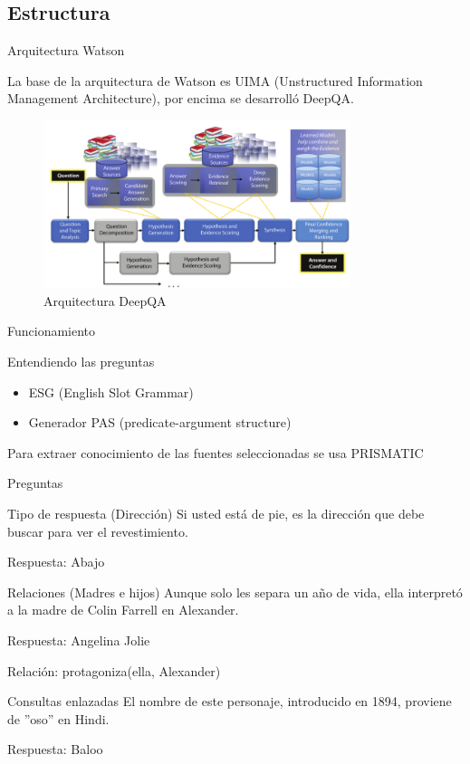 \documentclass[compress]{beamer}
\begin{document}
\subsection{Estructura}
\begin{frame}{Arquitectura Watson}
	\begin{block}{}
		La base de la arquitectura de Watson es UIMA (Unstructured Information Management Architecture), por encima se desarrolló DeepQA.
	\end{block}
	\begin{figure}[H]
		\centering
		\label{tiw-deepqa}
		\includegraphics[width=0.8\textwidth]{./Imagenes/deepQA.png}
		\caption{Arquitectura DeepQA}
	\end{figure}
\end{frame}

\begin{frame}{Funcionamiento}
	\begin{block}{Entendiendo las preguntas}
		\begin{itemize}
			\item ESG (English Slot Grammar)
			\item Generador PAS (predicate-argument structure)
		\end{itemize}
		Para extraer conocimiento de
		las fuentes seleccionadas se usa PRISMATIC
	\end{block}
\end{frame}


\begin{frame}{Preguntas}
	\begin{exampleblock}{Tipo de respuesta (Dirección)}		
		Si usted está de pie, es la dirección que debe buscar para ver el revestimiento.
		
		Respuesta: Abajo
	\end{exampleblock}	

	\begin{exampleblock}{Relaciones (Madres e hijos)}
		Aunque solo les separa un año de vida, ella interpretó a la madre de Colin Farrell en Alexander.
		
		Respuesta: Angelina Jolie
		
		Relación: protagoniza(ella, Alexander)
	\end{exampleblock}
	
	\begin{exampleblock}{Consultas enlazadas}
		El nombre de este personaje, introducido en 1894, proviene de ”oso” en Hindi.
		
		Respuesta: Baloo
	\end{exampleblock}
\end{frame}
\end{document}
